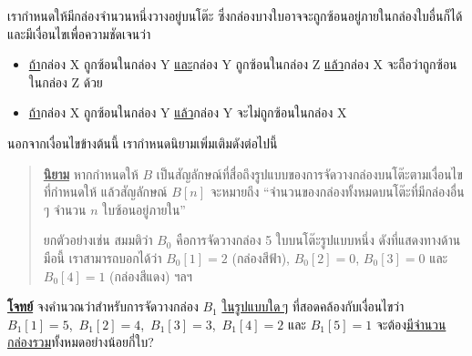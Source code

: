 \question{} 

เรากำหนดให้มีกล่องจำนวนหนึ่งวางอยู่บนโต๊ะ ซึ่งกล่องบางใบอาจจะถูกซ้อนอยู่ภายในกล่องใบอื่นก็ได้ และมีเงื่อนไขเพื่อความชัดเจนว่า
\begin{itemize}
    \item \uline{ถ้า}กล่อง X ถูกซ้อนในกล่อง Y \uline{และ}กล่อง Y ถูกซ้อนในกล่อง Z 
        \uline{แล้ว}กล่อง X จะถือว่าถูกซ้อนในกล่อง Z ด้วย
    \item \uline{ถ้า}กล่อง X ถูกซ้อนในกล่อง Y \uline{แล้ว}กล่อง Y จะไม่ถูกซ้อนในกล่อง X
\end{itemize}
นอกจากเงื่อนไขข้างต้นนี้ เรากำหนดนิยามเพิ่มเติมดังต่อไปนี้
\begin{quote}
    \textbf{\uline{นิยาม}}\; หากกำหนดให้ $B$ เป็นสัญลักษณ์ที่สื่อถึงรูปแบบของการจัดวางกล่องบนโต๊ะตามเงื่อนไขที่กำหนดให้ 
    แล้วสัญลักษณ์ $B[n]$ จะหมายถึง ``จำนวนของกล่องทั้งหมดบนโต๊ะที่มีกล่องอื่น ๆ จำนวน $n$ ใบซ้อนอยู่ภายใน''


    ยกตัวอย่างเช่น สมมติว่า $B_0$ คือการจัดวางกล่อง 5 ใบบนโต๊ะรูปแบบหนึ่ง ดังที่แสดงทางด้านมือนี้
    เราสามารถบอกได้ว่า $B_0[1] = \mathrm{2}$ (กล่องสีฟ้า), $B_0[2] = \mathrm{0}$, 
    $B_0[3] = \mathrm{0}$ และ $B_0[4] = \mathrm{1}$ (กล่องสีแดง) ฯลฯ
\end{quote}

\noindent
\textbf{\uline{โจทย์}}\; จงคำนวณว่าสำหรับการจัดวางกล่อง $B_1$ \uline{ในรูปแบบใด\,ๆ} 
ที่สอดคล้องกับเงื่อนไขว่า $B_1[1] = \mathrm{5}$,\, $B_1[2] = \mathrm{4}$,\, $B_1[3] = \mathrm{3}$,\, 
$B_1[4] = \mathrm{2}$ และ $B_1[5] = \mathrm{1}$ จะต้อง\uline{มีจำนวนกล่องรวม}ทั้งหมดอย่างน้อยกี่ใบ?
